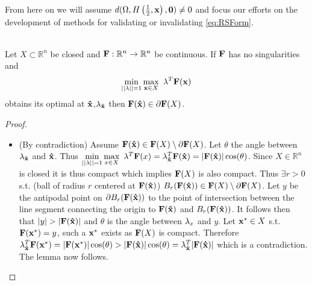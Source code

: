 From here on we will assume $d(\Omega,H\left(\frac{1}{2},\bold x\right),\bold 0)\neq 0$ and focus our efforts on the development of methods for validating or invalidating \ref{eq:RSForm}.\\



\begin{lem} \ \\
\label{lem:BdOpt}
Let $X\subset\mathbb{R}^n$ be closed and $\bold{F}:\mathbb{R}^n\rightarrow\mathbb{R}^n$ be continuous. 
If $\bold{F}$ has no singularities and $$\min\limits_{||\bold{\lambda}||=1}\max\limits_{\bold x\in X}\ \bold{\lambda}^T\bold{F}(\bold x)$$
obtains its optimal at $\bold{\hat{x}}$,$\bold{\lambda}_{\bold{\hat{x}}}$ then $\bold{F}(\bold{\hat{x}})\in \partial \bold{F}(X)$. 
\begin{proof} \ \\
\begin{itemize}
\item[](By contradiction) Assume $\bold{F}(\bold{\hat{x}})\in \bold{F}(X)\setminus\partial \bold{F}(X)$. 
Let $\theta$ the angle between $\bold{\lambda}_{\bold{\hat{x}}}$ and $\bold{\hat{x}}$. 
Thus $\min\limits_{||\bold{\lambda}||=1}\max\limits_{x\in X}\ \bold{\lambda}^T\bold{F}(x)=\bold{\lambda}_{\bold{\hat{x}}}^T\bold{F}(\bold{\hat{x}})=|\bold{F}(\bold{\hat{x}})|\cos(\theta)$. 
Since $X\in\mathbb{R}^n$ is closed it is thus compact which implies $\bold{F}(X)$ is also compact. 
Thus $\exists r>0$ s.t. (ball of radius $r$ centered at $\bold{F}(\bold{\hat{x}})$) $B_r(\bold{F}(\bold{\hat{x}}))\in \bold{F}(X)\setminus\partial \bold{F}(X)$. 
Let $y$ be the antipodal point on $\partial B_r(\bold{F}(\bold{\hat{x}}))$ to the point of intersection between the line segment connecting the origin to $\bold{F}(\bold{\hat{x}})$ and $B_r(\bold{F}(\bold{\hat{x}}))$. 
It follows then that $|y|>|\bold{F}(\bold{\hat{x}})|$ and $\theta$ is the angle between $\bold{\lambda}_x$ and $y$.   
Let $\bold{x^*}\in X$ s.t. $\bold{F}(\bold{x^*})=y$, such a $\bold{x^*}$ exists as $\bold{F}(X)$ is compact. 
Therefore $\bold{\lambda}_{\bold{\hat{x}}}^T\bold{F}(\bold{x^*})=|\bold{F}(\bold{x^*})|\cos(\theta)>|\bold{F}(\bold{\hat{x}})|\cos(\theta)=\bold{\lambda}_{\bold{\hat{x}}}^T|\bold{F}(\bold{\hat{x}})|$ which is a contradiction. 
The lemma now follows.
\end{itemize}
\end{proof}
\end{lem}

